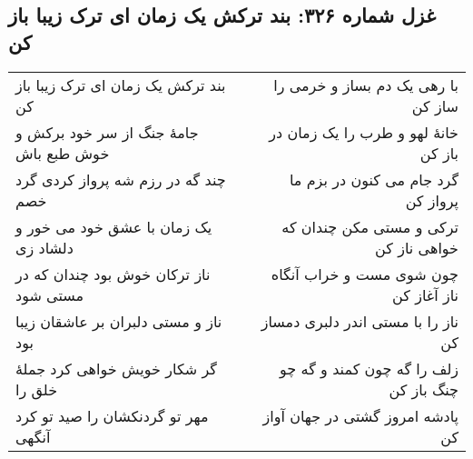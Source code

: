\begin{center}
\section*{غزل شماره ۳۲۶: بند ترکش یک زمان ای ترک زیبا باز کن}
\label{sec:326}
\begin{longtable}{l p{0.5cm} r}
بند ترکش یک زمان ای ترک زیبا باز کن
&&
با رهی یک دم بساز و خرمی را ساز کن
\\
جامهٔ جنگ از سر خود برکش و خوش طبع باش
&&
خانهٔ لهو و طرب را یک زمان در باز کن
\\
چند گه در رزم شه پرواز کردی گرد خصم
&&
گرد جام می کنون در بزم ما پرواز کن
\\
یک زمان با عشق خود می خور و دلشاد زی
&&
ترکی و مستی مکن چندان که خواهی ناز کن
\\
ناز ترکان خوش بود چندان که در مستی شود
&&
چون شوی مست و خراب آنگاه ناز آغاز کن
\\
ناز و مستی دلبران بر عاشقان زیبا بود
&&
ناز را با مستی اندر دلبری دمساز کن
\\
گر شکار خویش خواهی کرد جملهٔ خلق را
&&
زلف را گه چون کمند و گه چو چنگ باز کن
\\
مهر تو گردنکشان را صید تو کرد آنگهی
&&
پادشه امروز گشتی در جهان آواز کن
\\
\end{longtable}
\end{center}
